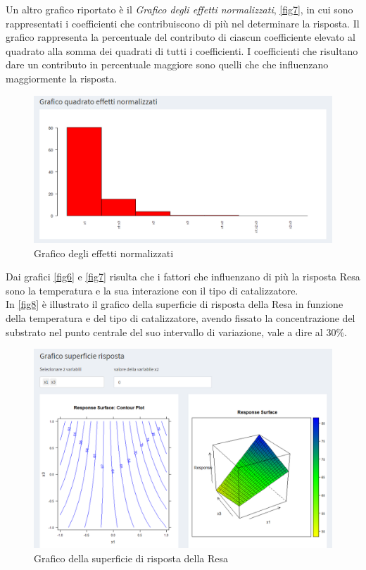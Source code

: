 \documentclass[
]{book}
\begin{document}
Un altro grafico riportato è il \emph{Grafico degli effetti normalizzati}, \autoref{fig7}, in cui sono rappresentati i coefficienti che contribuiscono di più nel determinare la risposta. Il grafico rappresenta la percentuale del contributo di ciascun coefficiente elevato al quadrato alla somma dei quadrati di tutti i coefficienti. I coefficienti che risultano dare un contributo in percentuale maggiore sono quelli che che influenzano maggiormente la risposta.

\begin{figure}

{\centering \includegraphics[width=1\linewidth]{Immagini/07_coeff_norm} 

}

\caption{Grafico degli effetti normalizzati \label{fig7}}\label{fig:unnamed-chunk-11}
\end{figure}

Dai grafici \autoref{fig6} e \autoref{fig7} risulta che i fattori che influenzano di più la risposta Resa sono la temperatura e la sua interazione con il tipo di catalizzatore.\\
In \autoref{fig8} è illustrato il grafico della superficie di risposta della Resa in funzione della temperatura e del tipo di catalizzatore, avendo fissato la concentrazione del substrato nel punto centrale del suo intervallo di variazione, vale a dire al 30\%.

\begin{figure}

{\centering \includegraphics[width=1\linewidth]{Immagini/08_sup_risp} 

}

\caption{Grafico della superficie di risposta della Resa \label{fig8}}\label{fig:unnamed-chunk-12}
\end{figure}
\end{document}
